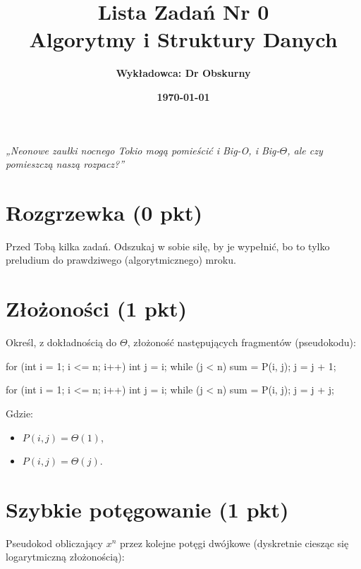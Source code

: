 \documentclass[12pt]{article}
\title{\textbf{\huge Lista Zadań Nr 0 \\[0.3em]
{\Large Algorytmy i Struktury Danych}}}
\author{\textbf{\Large Wykładowca: Dr Obskurny}}
\date{\textbf{\Large \today}}  %
\begin{document}
\maketitle

\vspace{2em}
\begin{center}
  \textit{\large „Neonowe zaułki nocnego Tokio mogą pomieścić i Big-O, i Big-$\Theta$, 
  ale czy pomieszczą naszą rozpacz?”}
\end{center}
\vspace{2em}


\section{Rozgrzewka (0 pkt)}
Przed Tobą kilka zadań. Odszukaj w sobie siłę, by je wypełnić, bo to tylko preludium 
do prawdziwego (algorytmicznego) mroku.

\section{Złożoności (1 pkt)}
Określ, z dokładnością do $\Theta$, złożoność następujących fragmentów (pseudokodu):

\begin{cppcode}
for (int i = 1; i <= n; i++) {
    int j = i;
    while (j < n) {
        sum = P(i, j);
        j = j + 1;
    }
}
\end{cppcode}

\begin{cppcode}
for (int i = 1; i <= n; i++) {
    int j = i;
    while (j < n) {
        sum = P(i, j);
        j = j + j;
    }
}
\end{cppcode}

Gdzie:
\begin{itemize}
  \item $P(i,j) = \Theta(1)$,
  \item $P(i,j) = \Theta(j)$.
\end{itemize}

\section{Szybkie potęgowanie (1 pkt)}
Pseudokod obliczający $x^n$ przez kolejne potęgi dwójkowe (dyskretnie ciesząc się 
logarytmiczną złożonością):

\end{document}
